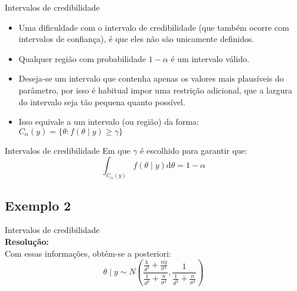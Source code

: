 \documentclass{beamer}
\theoremstyle{definition}
\begin{document}
\begin{frame}{Intervalos de credibilidade}
\begin{itemize}
\item Uma dificuldade com o intervalo de credibilidade (que também ocorre com intervalos de confiança), é que eles não são unicamente definidos.
\item Qualquer região com probabilidade $1-\alpha$ é um intervalo válido.
\item Deseja-se um intervalo que contenha apenas os valores mais plausíveis do parâmetro, por isso é habitual impor uma restrição adicional, que a largura do intervalo seja tão pequena quanto possível.
\item Isso equivale a um intervalo (ou região) da forma: $C_\alpha(y)={\{\theta: f(\theta \mid y) \geq \gamma\}}$
\end{itemize}
\end{frame}

\begin{frame}{Intervalos de credibilidade}
Em que $\gamma$ é escolhido para garantir que:
$$\int_{C_\alpha(y)} f(\theta \mid y) \mathrm{d} \theta=1-\alpha$$
\end{frame}
\subsection{Exemplo 2}
\begin{frame}{Intervalos de credibilidade}
 \\
\vspace{0.5cm}
\textbf{Resolução:} \\
Com essas informações, obtém-se a posteriori:
\begin{equation}
    \theta \mid y \sim N\left(\frac{\frac{b}{d^2}+\frac{n \bar{y}}{\sigma^2}}{\frac{1}{d^2}+\frac{n}{\sigma^2}}, \frac{1}{\frac{1}{d^2}+\frac{n}{\sigma^2}}\right)
\end{equation}
\end{frame}  
\end{document}

